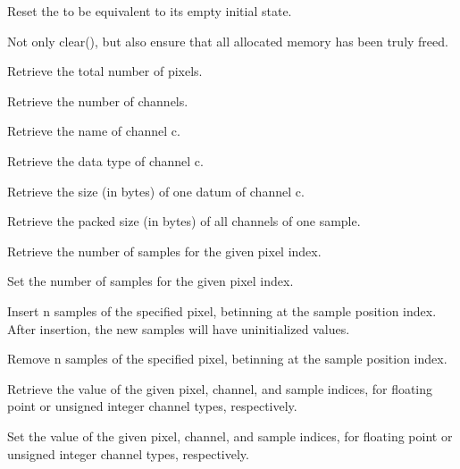 Reset the \DeepData to be equivalent to its empty initial state.
\apiend

Not only {\cf clear()}, but also ensure that all allocated memory has been
truly freed.
\apiend

Retrieve the total number of pixels.
\apiend

Retrieve the number of channels.
\apiend

Retrieve the name of channel {\cf c}.
\apiend

Retrieve the data type of channel {\cf c}.
\apiend

Retrieve the size (in bytes) of one datum of channel {\cf c}.
\apiend

Retrieve the packed size (in bytes) of all channels of one sample.
\apiend

Retrieve the number of samples for the given pixel index.
\apiend

Set the number of samples for the given pixel index.
\apiend

Insert {\cf n} samples of the specified pixel, betinning at the sample
position index. After insertion, the new samples will have uninitialized
values.
\apiend

Remove {\cf n} samples of the specified pixel, betinning at the sample
position index.
\apiend

Retrieve the value of the given pixel, channel, and sample indices, for
floating point or unsigned integer channel types, respectively.
\apiend

Set the value of the given pixel, channel, and sample indices, for
floating point or unsigned integer channel types, respectively.
\apiend

